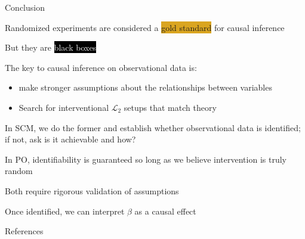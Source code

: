 \documentclass[notes,11pt, aspectratio=169, usenames, dvipsnames]{beamer}
\newenvironment{wideitemize}{\itemize\addtolength{\itemsep}{10pt}}{\enditemize}
\begin{document}
\begin{frame}{Conclusion}
	\begin{wideitemize}
		\item Randomized experiments are considered a \colorbox{Goldenrod}{gold standard} for causal inference
		\item But they are \colorbox{Black}{\textcolor{White}{black boxes}}
		
		\item The key to causal inference on observational data is:
		\begin{itemize}
			\item make stronger assumptions about the relationships between variables
			\item Search for interventional $\mathcal{L}_2$ setups that match theory 
		\end{itemize}
		\item In SCM, we do the former and establish whether observational data is identified; if not, ask is it achievable and how?
		\item In PO, identifiability is guaranteed so long as we believe intervention is truly random
		\item Both require rigorous validation of assumptions
		\item Once identified, we can interpret $\beta$ as a causal effect 
	\end{wideitemize}
\end{frame}

\begin{frame}[allowframebreaks]{References}
	\printbibliography
\end{frame}



\end{document}
